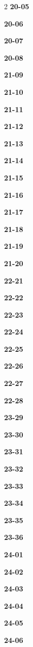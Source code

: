 \documentclass[10pt,a4paper]{article}
\begin{document}
\begin{multicols}{2}
\noindent\textbf{20-05}\ \par
\noindent\textbf{20-06}\ \par
\noindent\textbf{20-07}\ \par
\noindent\textbf{20-08}\ \par
\noindent\textbf{21-09}\ \par
\noindent\textbf{21-10}\ \par
\noindent\textbf{21-11}\ \par
\noindent\textbf{21-12}\ \par
\noindent\textbf{21-13}\ \par
\noindent\textbf{21-14}\ \par
\noindent\textbf{21-15}\ \par
\noindent\textbf{21-16}\ \par
\noindent\textbf{21-17}\ \par
\noindent\textbf{21-18}\ \par
\noindent\textbf{21-19}\ \par
\noindent\textbf{21-20}\ \par
\noindent\textbf{22-21}\ \par
\noindent\textbf{22-22}\ \par
\noindent\textbf{22-23}\ \par
\noindent\textbf{22-24}\ \par
\noindent\textbf{22-25}\ \par
\noindent\textbf{22-26}\ \par
\noindent\textbf{22-27}\ \par
\noindent\textbf{22-28}\ \par
\noindent\textbf{23-29}\ \par
\noindent\textbf{23-30}\ \par
\noindent\textbf{23-31}\ \par
\noindent\textbf{23-32}\ \par
\noindent\textbf{23-33}\ \par
\noindent\textbf{23-34}\ \par
\noindent\textbf{23-35}\ \par
\noindent\textbf{23-36}\ \par
\noindent\textbf{24-01}\ \par
\noindent\textbf{24-02}\ \par
\noindent\textbf{24-03}\ \par
\noindent\textbf{24-04}\ \par
\noindent\textbf{24-05}\ \par
\noindent\textbf{24-06}\ \par

\end{multicols}
\end{document}
